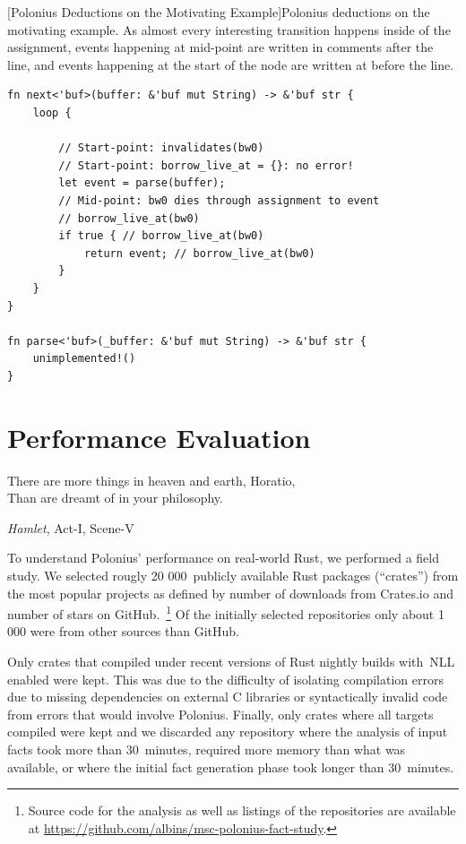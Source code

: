 \documentclass[11pt,a4paper,twoside,openany]{report}
\newenvironment{sourcecode}{\captionsetup{type=listing}}{}
\renewcommand\_{\textunderscore\allowbreak}
\begin{document}
\begin{sourcecode}
  [Polonius Deductions on the Motivating Example]{Polonius
    deductions on the motivating
    example. As almost every interesting transition happens inside of the
    assignment, events happening at mid-point are written in comments after the
    line, and events happening at the start of the node are written at before
    the line.}\label{lst:motivating-example-deductions}
\begin{verbatim}
fn next<'buf>(buffer: &'buf mut String) -> &'buf str {
    loop {

        // Start-point: invalidates(bw0)
        // Start-point: borrow_live_at = {}: no error!
        let event = parse(buffer); 
        // Mid-point: bw0 dies through assignment to event
        // borrow_live_at(bw0)
        if true { // borrow_live_at(bw0)
            return event; // borrow_live_at(bw0)
        }
    }
}

fn parse<'buf>(_buffer: &'buf mut String) -> &'buf str {
    unimplemented!()
}
\end{verbatim}
\end{sourcecode}


\chapter{Performance Evaluation}\label{sec:field-study-borrow}
\epigraph{There are more things in heaven and earth, Horatio,\\
  Than are dreamt of in your philosophy.}{\textit{Hamlet}, Act-I, Scene-V}

To understand Polonius' performance on real-world Rust, we performed a field
study. We selected rougly 20 000~publicly available Rust packages (``crates'')
from the most popular projects as defined by number of downloads from Crates.io
and number of stars on GitHub.~\footnote{Source code for the analysis as well as
  listings of the repositories are available at
  \url{https://github.com/albins/msc-polonius-fact-study}.} Of the initially selected repositories only about 1 000 were from other sources
than GitHub.

Only crates that compiled under recent versions of Rust nightly builds with~NLL
enabled were kept. This was due to the difficulty of isolating compilation
errors due to missing dependencies on external C libraries or syntactically
invalid code from errors that would involve Polonius. Finally, only crates where
all targets compiled were kept and we discarded any repository where the
analysis of input facts took more than 30~minutes, required more memory than
what was available, or where the initial fact generation phase took longer than
30~minutes.
\end{document}

